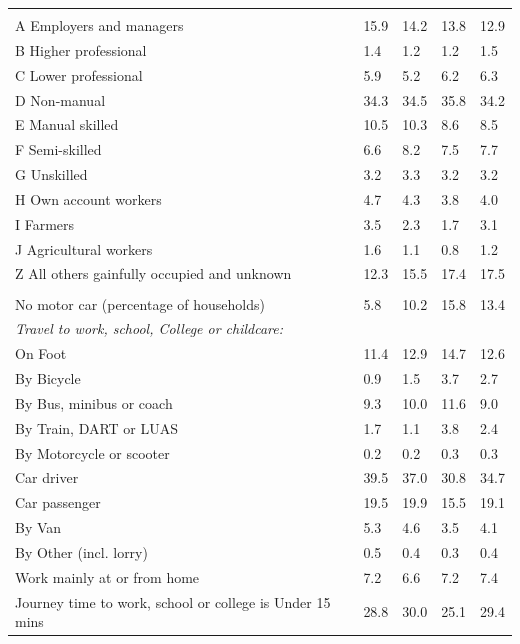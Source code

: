 \documentclass{article}
\begin{document}
\begin{table}[h]
\begin{tabular}{KTTTT}
\hline
    \\ 
    \hline
A Employers and managers & 15.9& 14.2& 13.8& 12.9\\
B Higher professional & 1.4& 1.2& 1.2& 1.5\\
C Lower professional & 5.9& 5.2& 6.2& 6.3\\
D Non-manual & 34.3& 34.5& 35.8& 34.2\\
E Manual skilled & 10.5& 10.3&  8.6&  8.5\\
F Semi-skilled & 6.6& 8.2& 7.5& 7.7\\
G Unskilled & 3.2& 3.3& 3.2& 3.2\\
H Own account workers & 4.7& 4.3& 3.8& 4.0\\
I Farmers & 3.5& 2.3& 1.7& 3.1\\
J Agricultural workers & 1.6& 1.1& 0.8& 1.2\\
Z All others gainfully occupied and unknown & 12.3& 15.5& 17.4& 17.5\\
\hline
{}\hline
    \\ 
    \hline
No motor car (percentage of households) &  5.8& 10.2& 15.8& 
13.4\\
    \hline 
\emph{Travel to work, school, College or childcare:} & & & \\
\quad On Foot & 11.4& 12.9& 14.7& 12.6\\ 
\quad By Bicycle & 0.9& 1.5& 3.7& 2.7\\ 
\quad By Bus, minibus or coach &  9.3& 10.0& 11.6&  9.0\\
\quad By Train, DART or LUAS & 1.7& 1.1& 3.8& 2.4\\
\quad By Motorcycle or scooter & 0.2& 0.2& 0.3& 0.3\\
\quad Car driver & 39.5 & 37.0& 30.8& 34.7\\
\quad Car passenger & 19.5& 19.9& 15.5& 19.1\\
\quad By Van & 5.3& 4.6& 3.5& 4.1\\
\quad By Other (incl. lorry) & 0.5& 0.4& 0.3& 0.4\\
    \hline
Work mainly at or from home & 7.2& 6.6& 7.2& 7.4\\
Journey time to work, school or college is Under 15 mins & 28.8& 30.0& 25.1& 29.4\\

\end{tabular}
\end{table}
\end{document}
